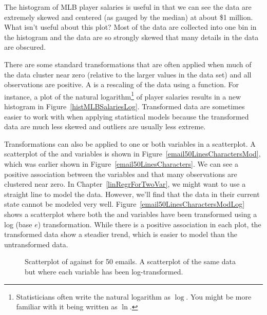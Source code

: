 \begin{example}{The histogram of MLB player salaries is useful in that we can see the data are extremely skewed and centered (as gauged by the median) at about \$1 million. What isn't useful about this plot?}
Most of the data are collected into one bin in the histogram and the data are so strongly skewed that many details in the data are obscured.
\end{example}

There are some standard transformations that are often applied when much of the data cluster near zero (relative to the larger values in the data set) and all observations are positive. A  is a rescaling of the data using a function. For instance, a plot of the natural logarithm\footnote{Statisticians often write the natural logarithm as $\log$. You might be more familiar with it being written as $\ln$.} of player salaries results in a new histogram in Figure~\ref{histMLBSalariesLog}. Transformed data are sometimes easier to work with when applying statistical models because the transformed data are much less skewed and outliers are usually less extreme.

Transformations can also be applied to one or both variables in a scatterplot. A scatterplot of the  and  variables is shown in Figure~\ref{email50LinesCharactersMod}, which was earlier shown in Figure~\ref{email50LinesCharacters}. We can see a positive association between the variables and that many observations are clustered near zero. In Chapter~\ref{linRegrForTwoVar}, we might want to use a straight line to model the data. However, we'll find that the data in their current state cannot be modeled very well. Figure~\ref{email50LinesCharactersModLog} shows a scatterplot where both the  and  variables have been transformed using a log (base $e$) transformation. While there is a positive association in each plot, the transformed data show a steadier trend, which is easier to model than the untransformed data.

\begin{figure}
\centering
{}
\caption{ Scatterplot of  against  for 50 emails.  A scatterplot of the same data but where each variable has been log-transformed.}
\label{email50LinesCharactersModMain}
\end{figure}

